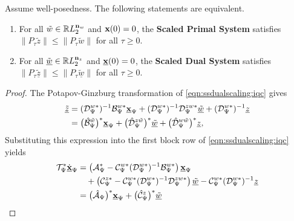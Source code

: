 \begin{theorem}\label{thm:scaledduall2gain}
    Assume well-posedness. The following statements are equivalent.
    \begin{enumerate}
    \item For all $\tilde{w}\in\mathbb{R} L_2^{\mathbf{n}_w}$ and $\mathbf{x}(0)=0$, the \textbf{Scaled Primal System}
    satisfies $\|P_\tau\tilde{z}\| \leq \|P_\tau\tilde{w}\|$ for all $\tau\geq0$.
    \item For all $\tilde{\underline{w}}\in\mathbb{R} L_2^{\mathbf{n}_z}$ and $\underline{\mathbf{x}}(0)=0$, the \textbf{Scaled Dual System}
    satisfies $\|P_\tau\tilde{\underline{z}}\| \leq \|P_\tau\tilde{\underline{w}}\|$ for all $\tau\geq0$.
    \end{enumerate}
\end{theorem}
\begin{proof}
    The Potapov-Ginzburg transformation of \eqref{eqn:ssdualscaling:iqc} gives
    \begin{align*}
        \underline{\tilde{z}}
        &=
        (\mathcal{D}_\Psi^{w*})^{-1}
            \mathcal{B}_\Psi^{w*}\underline{\mathbf{x}}_\Psi
        +(\mathcal{D}_\Psi^{w*})^{-1}
            \mathcal{D}_\Psi^{zw*}\underline{\tilde{w}}
        +(\mathcal{D}_\Psi^{w*})^{-1}\underline{z}\\
        &=
        \bigl(\hat{\mathcal{B}}_\Psi^{\tilde{w}}\bigr)^*
            \underline{\mathbf{x}}_\Psi
        +\bigl(\hat{\mathcal{D}}_\Psi^{z\tilde{w}}\bigr)^*
            \underline{\tilde{w}}
        +\bigl(\hat{\mathcal{D}}_\Psi^{w\tilde{w}}\bigr)^*
            \underline{z},
    \end{align*}
    Substituting this expression into the
    first block row of \eqref{eqn:ssdualscaling:iqc} yields
    \begin{align*}
        \mcl{T}_\Psi^*\dot{\underline{\mbf{x}}}_\Psi
        &=
        \left(
            \mcl{A}_\Psi^*
            -
            \mcl{C}_\Psi^{w*}(\mcl{D}_\Psi^{w*})^{-1}
            \mcl{B}_\Psi^{w*}
        \right)\underline{\mbf{x}}_\Psi\\
        &\quad+
        \left(
            \mcl{C}_\Psi^{z*}
            -
            \mcl{C}_\Psi^{w*}(\mcl{D}_\Psi^{w*})^{-1}
            \mcl{D}_\Psi^{zw*}
        \right)\underline{\tilde{w}}
        -
        \mcl{C}_\Psi^{w*}(\mcl{D}_\Psi^{w*})^{-1}
            \underline{z}\\
        &=
        \bigl(\hat{\mcl{A}}_\Psi\bigr)^*
            \underline{\mbf{x}}_\Psi
        +
        \bigl(\hat{\mcl{C}}_\Psi^{z}\bigr)^*
            \underline{\tilde{w}}

\end{align*}
\end{proof}

